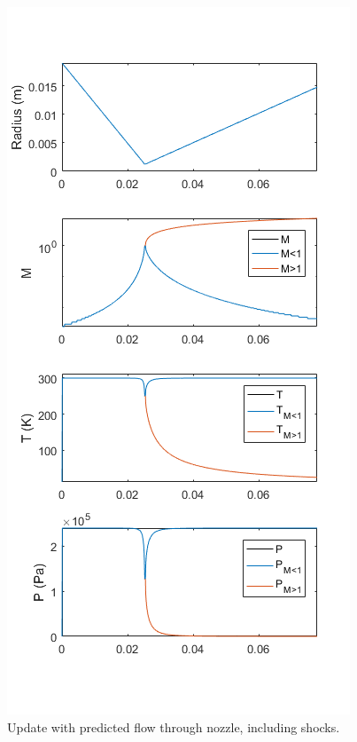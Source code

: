 \documentclass[journal]{IEEEtran}
\begin{document}
\begin{figure}[htp]
  \centering
  \includegraphics[width=\linewidth]{figs/flow.png}
  \caption[P17101 Arcjet Annotated Cutaway]{{\color{red}Update with predicted flow through nozzle, including shocks.}
\label{fig:flow-graphs}
}
\end{figure}
\end{document}
